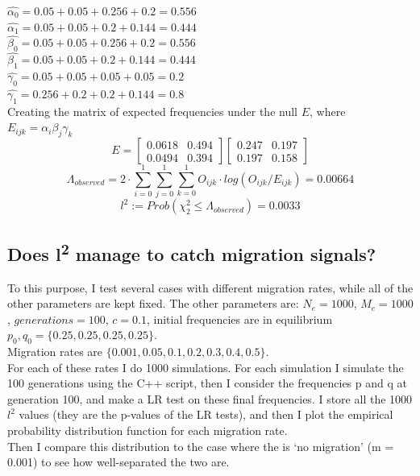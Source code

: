 \documentclass[a4paper,12pt]{article}
\begin{document}
\noindent $\hat{\alpha_{0}} = 0.05+0.05+0.256+0.2 = 0.556$\\
\noindent $\hat{\alpha_{1}} = 0.05+0.05+0.2+0.144 = 0.444$\\
\noindent $\hat{\beta_{0}} = 0.05+0.05+0.256+0.2 = 0.556$\\
\noindent $\hat{\beta_{1}} = 0.05+0.05+0.2+0.144 = 0.444$\\
\noindent $\hat{\gamma_{0}} = 0.05+0.05+0.05+0.05 = 0.2$\\
\noindent $\hat{\gamma_{1}} = 0.256+0.2+0.2+0.144 = 0.8$\\

\noindent Creating the matrix of expected frequencies under the null $E$, where $E_{ijk} = \alpha_i \beta_j \gamma_k$
$$ E =
\begin{bmatrix}
0.0618 & 0.494\\
0.0494 & 0.394
\end{bmatrix} 
\begin{bmatrix}
0.247 & 0.197\\
0.197 & 0.158
\end{bmatrix} 
$$
  $$\Lambda_{observed} = 2 \cdot \sum_{i = 0}^1  \sum_{j = 0}^1  \sum_{k = 0}^1 O_{ijk}\cdot log(O_{ijk}/E_{ijk}) = 0.00664$$
$$ l^2 := Prob(\chi_2^2 \le \Lambda_{observed}) = 0.0033$$  

\subsection {Does l\textsuperscript{2} manage to catch migration signals?}
To this purpose, I test several cases with different migration rates, while all of the other parameters are kept fixed.
The other parameters are: $N_e = 1000$, $M_e = 1000$, $generations = 100$, $c = 0.1$, initial frequencies are in equilibrium $p_0, q_0 = \{0.25,0.25,0.25,0.25\}$.\\
\noindent Migration rates are $\{0.001, 0.05, 0.1, 0.2, 0.3, 0.4, 0.5\}$.\\

\noindent For each of these rates I do 1000 simulations. For each simulation I simulate the 100 generations using the C++ script, then I consider the frequencies p and q at generation 100, and make a LR test on these final frequencies. I store all the 1000 $l^2$ values (they are the p-values of the LR tests), and then I plot the empirical probability distribution function for each migration rate.\\
Then I compare this distribution to the case where the is `no migration' (m = 0.001) to see how well-separated the two are.
\end{document}
